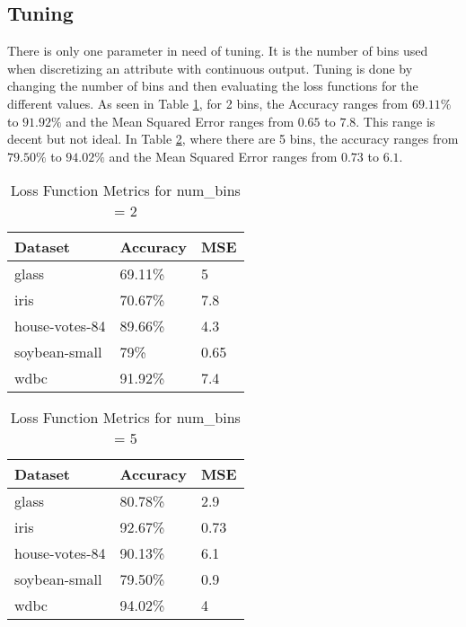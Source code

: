 \documentclass[twoside,11pt]{article}
\begin{document}
\subsection{Tuning}

There is only one parameter in need of tuning. It is the number of bins used when discretizing an attribute with continuous output. Tuning is done by changing the number of bins and then evaluating the loss functions for the different values.
As seen in Table \ref{tab:metrics2}, for 2 bins, the Accuracy ranges from $69.11\%$ to $91.92\%$ and the Mean Squared Error ranges from $0.65$ to $7.8$. This range is decent but not ideal.
In Table \ref{tab:metrics5}, where there are 5 bins, the accuracy ranges from $79.50\%$ to $94.02\%$ and the Mean Squared Error ranges from $0.73$ to $6.1$.

\begin{table}[h]
	\centering
	\caption{Loss Function Metrics for num\_bins = 2} \label{tab:metrics2}
	\begin{tabular}{|l|l|l|}
		\hline
		Dataset                  & Accuracy & MSE  \\ \hline
		glass                    & 69.11\%  & 5    \\ \hline
		iris                     & 70.67\%  & 7.8  \\ \hline
		house-votes-84           & 89.66\%  & 4.3  \\ \hline
		soybean-small            & 79\%     & 0.65 \\ \hline
		wdbc                     & 91.92\%  & 7.4  \\ \hline
	\end{tabular}
\end{table}

\begin{table}[h]
	\centering
	\caption{Loss Function Metrics for num\_bins = 5} \label{tab:metrics5}
	\begin{tabular}{|l|l|l|}
		\hline
		Dataset                  & Accuracy & MSE  \\ \hline
		glass                    & 80.78\%  & 2.9  \\ \hline
		iris                     & 92.67\%  & 0.73 \\ \hline
		house-votes-84           & 90.13\%  & 6.1  \\ \hline
		soybean-small            & 79.50\%  & 0.9  \\ \hline
		wdbc                     & 94.02\%  & 4    \\ \hline
	\end{tabular}
\end{table}
\end{document}
